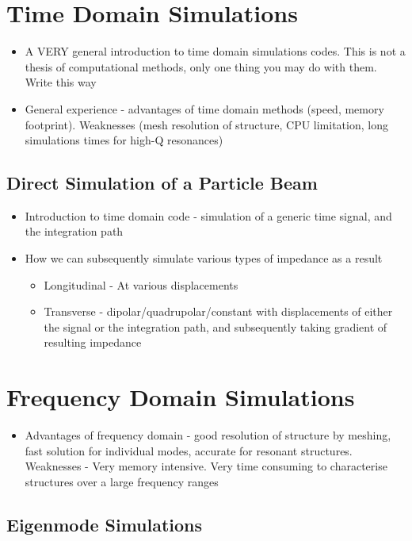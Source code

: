 \section{Time Domain Simulations}

\begin{itemize}
\item{A VERY general introduction to time domain simulations codes. This is not a thesis of computational methods, only one thing you may do with them. Write this way}
\item{General experience - advantages of time domain methods (speed, memory footprint). Weaknesses (mesh resolution of structure, CPU limitation, long simulations times for high-Q resonances)}
\end{itemize}

\subsection{Direct Simulation of a Particle Beam}

\begin{itemize}
\item{Introduction to time domain code - simulation of a generic time signal, and the integration path}
\item{How we can subsequently simulate various types of impedance as a result}
\begin{itemize}
\item{Longitudinal - At various displacements}
\item{Transverse - dipolar/quadrupolar/constant with displacements of either the signal or the integration path, and subsequently taking gradient of resulting impedance}
\end{itemize}
\end{itemize}

\section{Frequency Domain Simulations}

\begin{itemize}
\item{Advantages of frequency domain - good resolution of structure by meshing, fast solution for individual modes, accurate for resonant structures. Weaknesses - Very memory intensive. Very time consuming to characterise structures over a large frequency ranges}
\end{itemize}

\subsection{Eigenmode Simulations}

